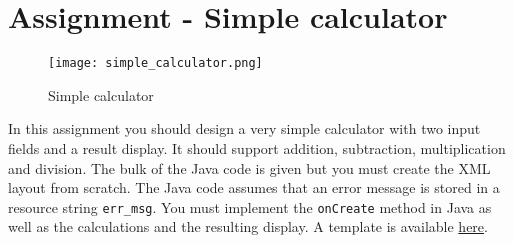 \section{Assignment - Simple calculator}
\begin{minipage}{0.45\textwidth}
\begin{figure}[H]
\centering
\texttt{[image: simple\_calculator.png]}
\caption{Simple calculator}
\label{fig:simcal}
\end{figure}
\end{minipage}
\hfill
\begin{minipage}{0.475\textwidth}
In this assignment you should design a very simple calculator with two input fields and a result display. It should support addition, subtraction, multiplication and division. The bulk of the Java code is given but you must create the XML layout from scratch. The Java code assumes that an error message is stored in a resource string \texttt{err\_msg}. You must implement the \texttt{onCreate} method in Java as well as the calculations and the resulting display. A template is available \href{https://github.com/JonSteinn/AndroidDevelopment/tree/master/templates/lab1}{here}.
\end{minipage}